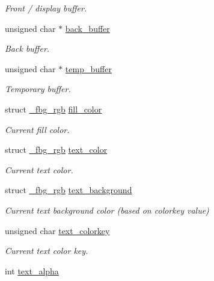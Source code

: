 \begin{DoxyCompactItemize}
\begin{DoxyCompactList}\small\item\em Front / display buffer. \end{DoxyCompactList}\item 
unsigned char $\ast$ \mbox{\hyperlink{struct__fbg_a907e7fc97965b972c17114c885e53735}{back\+\_\+buffer}}
\begin{DoxyCompactList}\small\item\em Back buffer. \end{DoxyCompactList}\item 
unsigned char $\ast$ \mbox{\hyperlink{struct__fbg_a0463af9bf583afe770b822c1fbb9a24d}{temp\+\_\+buffer}}
\begin{DoxyCompactList}\small\item\em Temporary buffer. \end{DoxyCompactList}\item 
struct \mbox{\hyperlink{fbgraphics_8h_struct__fbg__rgb}{\+\_\+fbg\+\_\+rgb}} \mbox{\hyperlink{struct__fbg_ad3cac82bd9448a4020a4e08621f5269a}{fill\+\_\+color}}
\begin{DoxyCompactList}\small\item\em Current fill color. \end{DoxyCompactList}\item 
struct \mbox{\hyperlink{fbgraphics_8h_struct__fbg__rgb}{\+\_\+fbg\+\_\+rgb}} \mbox{\hyperlink{struct__fbg_a4abb858439598b09790ec6d5d8326bb2}{text\+\_\+color}}
\begin{DoxyCompactList}\small\item\em Current text color. \end{DoxyCompactList}\item 
struct \mbox{\hyperlink{fbgraphics_8h_struct__fbg__rgb}{\+\_\+fbg\+\_\+rgb}} \mbox{\hyperlink{struct__fbg_afd34a8de5a853e915bd101f11d44cf67}{text\+\_\+background}}
\begin{DoxyCompactList}\small\item\em Current text background color (based on colorkey value) \end{DoxyCompactList}\item 
unsigned char \mbox{\hyperlink{struct__fbg_a06e65293cf0b48e70d76d63f5de453e6}{text\+\_\+colorkey}}
\begin{DoxyCompactList}\small\item\em Current text color key. \end{DoxyCompactList}\item 
int \mbox{\hyperlink{struct__fbg_a870987786121c51135f20b630d731abd}{text\+\_\+alpha}}

\end{DoxyCompactItemize}
